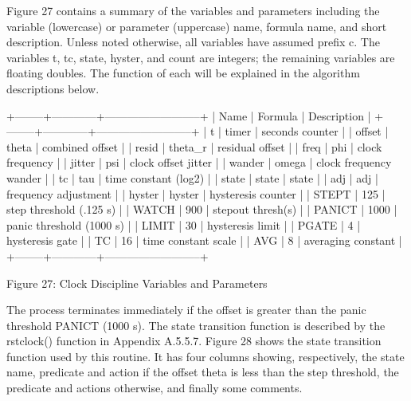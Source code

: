 Figure 27 contains a summary of the variables and parameters
including the variable (lowercase) or parameter (uppercase) name,
formula name, and short description.  Unless noted otherwise, all
variables have assumed prefix c.  The variables t, tc, state, hyster,
and count are integers; the remaining variables are floating doubles.
The function of each will be explained in the algorithm descriptions
below.

                +--------+------------+--------------------------+
            | Name   | Formula    | Description              |
            +--------+------------+--------------------------+
            | t      | timer      | seconds counter          |
            | offset | theta      | combined offset          |
            | resid  | theta_r    | residual offset          |
            | freq   | phi        | clock frequency          |
            | jitter | psi        | clock offset jitter      |
            | wander | omega      | clock frequency wander   |
            | tc     | tau        | time constant (log2)     |
            | state  | state      | state                    |
            | adj    | adj        | frequency adjustment     |
            | hyster | hyster     | hysteresis counter       |
            | STEPT  | 125        | step threshold (.125 s)  |
            | WATCH  | 900        | stepout thresh(s)        |
            | PANICT | 1000       | panic threshold (1000 s) |
            | LIMIT  | 30         | hysteresis limit         |
            | PGATE  | 4          | hysteresis gate          |
            | TC     | 16         | time constant scale      |
            | AVG    | 8          | averaging constant       |
            +--------+------------+--------------------------+

        Figure 27: Clock Discipline Variables and Parameters

The process terminates immediately if the offset is greater than the
panic threshold PANICT (1000 s).  The state transition function is
described by the rstclock() function in Appendix A.5.5.7.  Figure 28
shows the state transition function used by this routine.  It has
four columns showing, respectively, the state name, predicate and
action if the offset theta is less than the step threshold, the
predicate and actions otherwise, and finally some comments.

